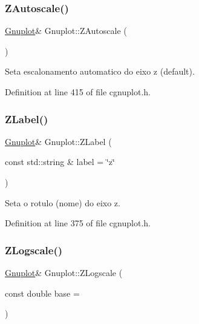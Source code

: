 \mbox{\label{class_gnuplot_ac926d0513fa38b316be4c6acfc65ca80}} 
\subsubsection{\texorpdfstring{Z\+Autoscale()}{ZAutoscale()}}
{\footnotesize\ttfamily \hyperlink{class_gnuplot}{Gnuplot}\& Gnuplot\+::\+Z\+Autoscale (\begin{DoxyParamCaption}{ }\end{DoxyParamCaption})\hspace{0.3cm}{\ttfamily [inline]}}



Seta escalonamento automatico do eixo z (default). 



Definition at line 415 of file cgnuplot.\+h.

\mbox{\label{class_gnuplot_ace776aa2b273c0ec934e856cb28416eb}} 
\subsubsection{\texorpdfstring{Z\+Label()}{ZLabel()}}
{\footnotesize\ttfamily \hyperlink{class_gnuplot}{Gnuplot}\& Gnuplot\+::\+Z\+Label (\begin{DoxyParamCaption}\item[{const std\+::string \&}]{label = {\ttfamily \char`\"{}z\char`\"{}} }\end{DoxyParamCaption})\hspace{0.3cm}{\ttfamily [inline]}}



Seta o rotulo (nome) do eixo z. 



Definition at line 375 of file cgnuplot.\+h.

\mbox{\label{class_gnuplot_a4a875f9e3f43e22d30be8e52c33df620}} 
\subsubsection{\texorpdfstring{Z\+Logscale()}{ZLogscale()}\hspace{0.1cm}{\footnotesize\ttfamily [1/2]}}
{\footnotesize\ttfamily \hyperlink{class_gnuplot}{Gnuplot}\& Gnuplot\+::\+Z\+Logscale (\begin{DoxyParamCaption}\item[{const double}]{base = {} }\end{DoxyParamCaption})\hspace{0.3cm}{\ttfamily [inline]}}



